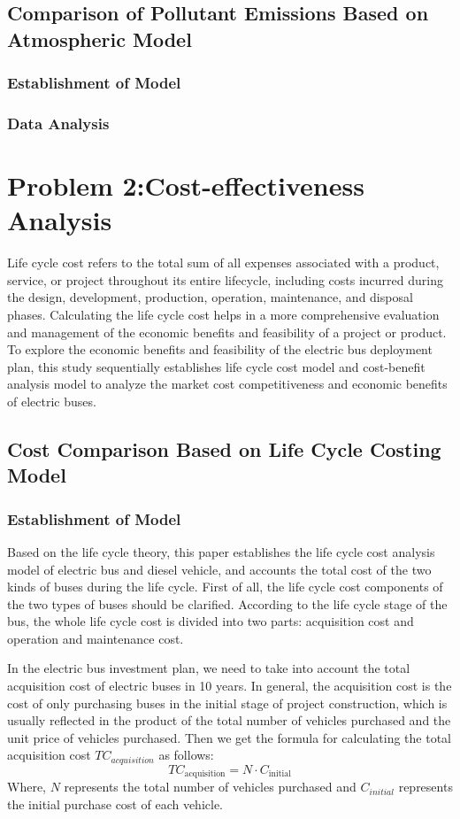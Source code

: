 \documentclass[12pt]{article}
\begin{document}
\subsection{Comparison of Pollutant Emissions Based on Atmospheric Model}
\subsubsection{Establishment of Model}
\subsubsection{Data Analysis}

\section{Problem 2:Cost-effectiveness Analysis}
Life cycle cost refers to the total sum of all expenses associated with a product, service, or project throughout its entire 
lifecycle, including costs incurred during the design, development, production, operation, maintenance, and disposal phases. 
Calculating the life cycle cost helps in a more comprehensive evaluation and management of the economic benefits and feasibility 
of a project or product. To explore the economic benefits and feasibility of the electric bus deployment plan, this study sequentially 
establishes life cycle cost model and cost-benefit analysis model to analyze the market cost competitiveness and economic benefits 
of electric buses.
\subsection{Cost Comparison Based on Life Cycle Costing Model}
\subsubsection{Establishment of Model}
Based on the life cycle theory, this paper establishes the life cycle cost analysis model of electric bus and diesel vehicle, 
and accounts the total cost of the two kinds of buses during the life cycle.
First of all, the life cycle cost components of the two types of buses should be clarified. According to the life cycle stage 
of the bus, the whole life cycle cost is divided into two parts: acquisition cost and operation and maintenance cost.


In the electric bus investment plan, we need to take into account the total acquisition cost of electric buses in 10 years. 
In general, the acquisition cost is the cost of only purchasing buses in the initial stage of project construction, which is usually 
reflected in the product of the total number of vehicles purchased and the unit price of vehicles purchased. Then we get the formula 
for calculating the total acquisition cost $TC_{acquisition}$ as follows:
\begin{equation}
    TC_{\text{acquisition}} = N \cdot C_{\text{initial}}
\end{equation}
Where, $N$ represents the total number of vehicles purchased and $C_{initial}$ represents the initial purchase cost of each vehicle.
\end{document}
